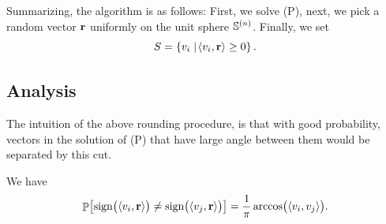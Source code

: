 Summarizing, the algorithm is as follows: First, we solve (P), next,
we pick a random vector $\mathbf{r}$ uniformly on the unit sphere
${\mathbb{S}^{(n)}}$. Finally, we set
\begin{equation*}
    S = \left\{  v_i  \;\middle\vert\; \! \left\langle {{v_i},{\mathbf{r}}} \right\rangle \geq 0  \right\}.
\end{equation*}



\subsection{Analysis}


The intuition of the above rounding procedure, is that with good
probability, vectors in the solution of (P) that have large angle
between them would be separated by this cut.


\newcommand{\SDotProd}[2]{\DotProd{\smash{#1}}{\smash{#2}}}%
\newcommand{\sign}{\mathrm{sign}}

\begin{lemma}
    We have
    \[
        \Prob{%
           \sign \bigl( \SDotProd{v_i}{\vecRand} \bigr)%
           \neq%
           \sign \bigl( \SDotProd{v_j}{\vecRand} \bigr)%
           \bigr.  }%
        =%
        \frac{1}{\pi} \arccos \bigl( \SDotProd{v_i}{v_j} \bigr).
    \]
\end{lemma}


\SaveIndent%


